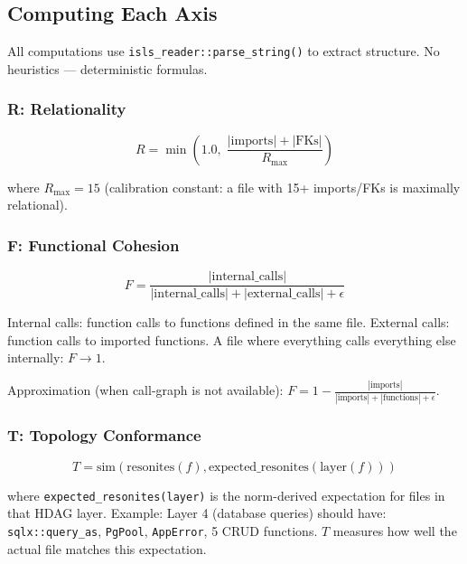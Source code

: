 \documentclass[11pt,a4paper]{article}
\begin{document}
\subsection{Computing Each Axis}

All computations use \texttt{isls\_reader::parse\_string()} 
to extract structure. No heuristics --- deterministic formulas.

\subsubsection{R: Relationality}

\begin{equation}
R = \min\!\left(1.0,\;\frac{|\text{imports}| + |\text{FKs}|}{R_\text{max}}\right)
\end{equation}

where $R_\text{max} = 15$ (calibration constant: a file with 
15+ imports/FKs is maximally relational).

\subsubsection{F: Functional Cohesion}

\begin{equation}
F = \frac{|\text{internal\_calls}|}{|\text{internal\_calls}| + |\text{external\_calls}| + \epsilon}
\end{equation}

Internal calls: function calls to functions defined in the 
same file. External calls: function calls to imported functions. 
A file where everything calls everything else internally: $F \to 1$.

Approximation (when call-graph is not available): 
$F = 1 - \frac{|\text{imports}|}{|\text{imports}| + |\text{functions}| + \epsilon}$.

\subsubsection{T: Topology Conformance}

\begin{equation}
T = \text{sim}(\text{resonites}(f), \text{expected\_resonites}(\text{layer}(f)))
\end{equation}

where \texttt{expected\_resonites(layer)} is the norm-derived 
expectation for files in that HDAG layer. Example: Layer 4 
(database queries) should have: \texttt{sqlx::query\_as}, 
\texttt{PgPool}, \texttt{AppError}, 5 CRUD functions. 
$T$ measures how well the actual file matches this expectation.
\end{document}

